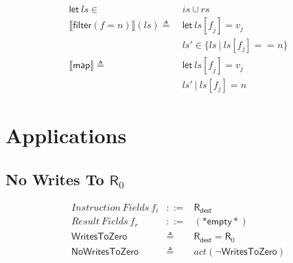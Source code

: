 \documentclass[12pt, letterpaper]{article}
\newcommand\interp[1]{\llbracket #1 \rrbracket}
\begin{document}
    \begin{align*}
        \mathsf{let}\ ls \in\ & is\cup rs\\
        \interp{\mathsf{filter}(f=n)}(ls)
            \triangleq\ &
            \mathsf{let}\ \mathit{ls[f_j]} = \mathit{v_j}\\
            &ls' \in \{ls\ |\ ls[f_j] == n\}\\
        \interp{\mathsf{map}}
            \triangleq\ &
            \mathsf{let}\ \mathit{ls[f_j]} = \mathit{v_j}\\
            &ls'\ |\ ls[f_j] = n
    \end{align*}

\section{Applications}

\subsection{No Writes To $\mathsf{R}_0$}

 \[
 \begin{array}{rcl}
   \mathit{Instruction\ Fields}\ f_i &::=& \mathsf{R}_{\mathsf{dest}} \\
   \mathit{Result\ Fields}\ f_r &::=& \mathsf{(*empty*)}\\
   \mathsf{WritesToZero} &\triangleq& \mathsf{R}_{\mathsf{dest}} = \mathsf{R}_0 \\
   \mathsf{NoWritesToZero} &\triangleq& \mathit{act}(\neg\mathsf{WritesToZero})
 \end{array}
 \]
 
\end{document}
